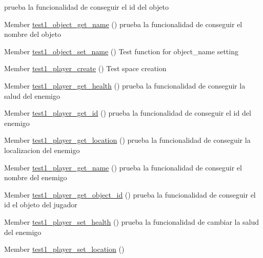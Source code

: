 \begin{DoxyRefList}
%
prueba la funcionalidad de conseguir el id del objeto  
\item[Member \mbox{\hyperlink{object__test_8h_ad2411bc3cc47c9905e63a3d9c561d369}{test1\+\_\+object\+\_\+get\+\_\+name}} ()]\label{test__test000027}%
%
prueba la funcionalidad de conseguir el nombre del objeto  
\item[Member \mbox{\hyperlink{object__test_8h_a74e25ad653c4a32b9922fff8e4f916fd}{test1\+\_\+object\+\_\+set\+\_\+name}} ()]\label{test__test000024}%
%
Test function for object\+\_\+name setting  
\item[Member \mbox{\hyperlink{player__test_8h_ab29768452373e16bb6aaa1f7998f62fb}{test1\+\_\+player\+\_\+create}} ()]\label{test__test000029}%
%
Test space creation  
\item[Member \mbox{\hyperlink{player__test_8h_a8c187dafe117147cd693931c22cc124d}{test1\+\_\+player\+\_\+get\+\_\+health}} ()]\label{test__test000043}%
%
prueba la funcionalidad de conseguir la salud del enemigo  
\item[Member \mbox{\hyperlink{player__test_8h_a790a75dc179c00c60c784d3e34c0e5aa}{test1\+\_\+player\+\_\+get\+\_\+id}} ()]\label{test__test000036}%
%
prueba la funcionalidad de conseguir el id del enemigo  
\item[Member \mbox{\hyperlink{player__test_8h_a408a557a0cff748c10fb9a03445af191}{test1\+\_\+player\+\_\+get\+\_\+location}} ()]\label{test__test000041}%
%
prueba la funcionalidad de conseguir la localizacion del enemigo  
\item[Member \mbox{\hyperlink{player__test_8h_a94068667d8faa66a4ad293dd2c60f2ef}{test1\+\_\+player\+\_\+get\+\_\+name}} ()]\label{test__test000034}%
%
prueba la funcionalidad de conseguir el nombre del enemigo  
\item[Member \mbox{\hyperlink{player__test_8h_a25a023ed7f9e0bf9d3a9a788a9f3059b}{test1\+\_\+player\+\_\+get\+\_\+object\+\_\+id}} ()]\label{test__test000051}%
%
prueba la funcionalidad de conseguir el id el objeto del jugador  
\item[Member \mbox{\hyperlink{player__test_8h_accf040138772ebaeeeb75afc9a9e0eae}{test1\+\_\+player\+\_\+set\+\_\+health}} ()]\label{test__test000045}%
%
prueba la funcionalidad de cambiar la salud del enemigo  
\item[Member \mbox{\hyperlink{player__test_8h_aec6799a4f46c3f3c471fcb668addcad4}{test1\+\_\+player\+\_\+set\+\_\+location}} ()]\label{test__test000038}%

\end{DoxyRefList}
